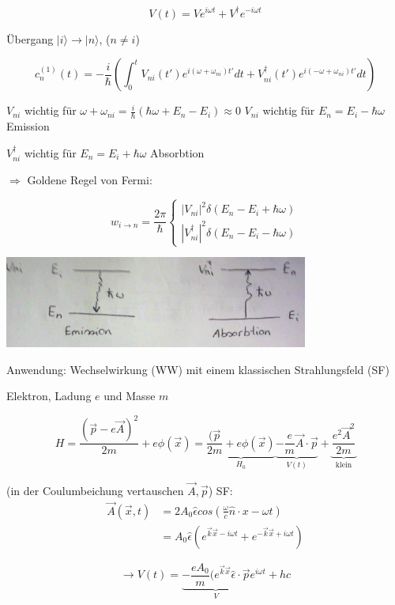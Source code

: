 \[ V(t) = V e^{i\omega t}+V^\dagger e^{-i\omega t}\]

Übergang \(|i\rangle \rightarrow |n\rangle \), (\(n\neq i\))


\[c^{(1)}_n(t) = -\frac{i}{\hbar} (\int_0^t V_{ni}(t') e^{i(\omega+\omega_{ni})t'}dt + V^{\dagger}_{ni}(t') e^{i(-\omega+\omega_{ni})t'}dt)\]

\(V_{ni}\) wichtig für \(\omega + \omega_{ni} = \frac{i}{\hbar}(\hbar \omega +E_n-E_i)\approx 0\) \(V_{ni}\) wichtig für \(E_n = E_i -\hbar \omega\) Emission

\(V^\dagger_{ni}\) wichtig für \(E_n = E_i +\hbar\omega\) Absorbtion

\(\Rightarrow \) Goldene Regel von Fermi:

\[\boxed{ w_{i\rightarrow n} = \frac{2\pi}{\hbar} \begin{cases}
    |V_{ni}|^2 \delta(E_n-E_i+\hbar\omega) \\
    |V^\dagger_{ni}|^2 \delta(E_n-E_i-\hbar\omega)
  \end{cases}}\]




\includegraphics[width=0.75\textwidth]{kap03_09.png}

Anwendung: Wechselwirkung (WW) mit einem klassischen Strahlungsfeld (SF)

Elektron, Ladung \(e\) und Masse \(m\)

\[ H = \frac{(\vec p - e\vec A)^2}{2m}+e\phi(\vec x) =  \underbrace{\frac{(\vec p}{2m}+e\phi(\vec x)}_{H_0}\underbrace{ - \frac{e}{m}\vec A\cdot \vec p}_{V(t)}+\underbrace{\frac{e^2\vec A^2}{2m}}_{\text{klein}}\]

(in der Coulumbeichung vertauschen \(\vec A,\vec p\)) SF:
\begin{align}
  \vec A(\vec x,t) &= 2A_0 \hat \epsilon cos(\frac{\omega}{c}\hat n\cdot x -\omega t)\\
  &= A_0 \hat \epsilon (e^{\vec k\vec x-i\omega t}+e^{-\vec k\vec x+i\omega t})
\end{align}

\[\rightarrow V(t) = \underbrace{-\frac{eA_0}{m}(e^{\vec k\vec x}\hat \epsilon\cdot\vec p}_{V} e^{i\omega t} + hc\]

